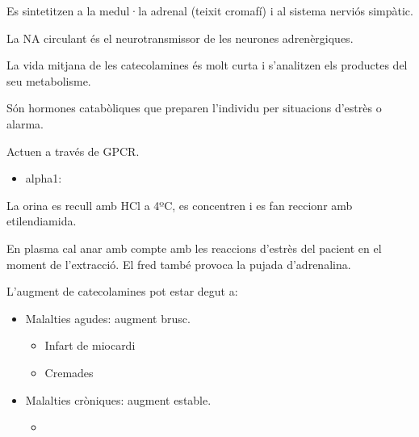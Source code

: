 Es sintetitzen a la medul·la adrenal (teixit cromafí) i al sistema
nerviós simpàtic.

La NA circulant és el neurotransmissor de les neurones adrenèrgiques.

La vida mitjana de les catecolamines és molt curta i s'analitzen els
productes del seu metabolisme.

Són hormones catabòliques que preparen l'individu per situacions
d'estrès o alarma.

Actuen a través de GPCR.

\begin{itemize}
\item alpha1: 
\end{itemize}

La orina es recull amb HCl a 4ºC, es concentren i es fan reccionr amb
etilendiamida.

En plasma cal anar amb compte amb les reaccions d'estrès del pacient
en el moment de l'extracció. El fred també provoca la pujada
d'adrenalina.

L'augment de catecolamines pot estar degut a:
\begin{itemize}
\item Malalties agudes: augment brusc.
  \begin{itemize}
  \item Infart de miocardi
  \item Cremades
  \end{itemize}
\item Malalties cròniques: augment estable.
  \begin{itemize}
  \item 
  \end{itemize}
\end{itemize}

